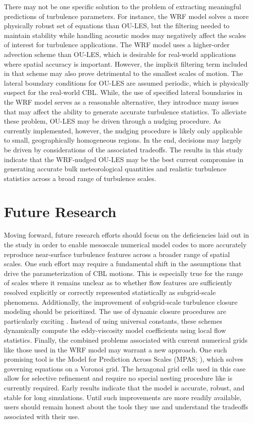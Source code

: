 There may not be one specific solution to the problem of extracting meaningful predictions of turbulence parameters. For instance, the WRF model solves a more physically robust set of equations than OU-LES, but the filtering needed to maintain stability while handling acoustic modes may negatively affect the scales of interest for turbulence applications. The WRF model uses a higher-order advection scheme than OU-LES, which is desirable for real-world applications where spatial accuracy is important. However, the implicit filtering term included in that scheme may also prove detrimental to the smallest scales of motion. The lateral boundary conditions for OU-LES are assumed periodic, which is physically suspect for the real-world CBL. While, the use of specified lateral boundaries in the WRF model serves as a reasonable alternative, they introduce many issues that may affect the ability to generate accurate turbulence statistics. To alleviate these problem, OU-LES may be driven through a nudging procedure. As currently implemented, however, the nudging procedure is likely only applicable to small, geographically homogeneous regions. In the end, decisions may largely be driven by considerations of the associated tradeoffs. The results in this study indicate that the WRF-nudged OU-LES may be the best current compromise in generating accurate bulk meteorological quantities and realistic turbulence statistics across a broad range of turbulence scales.

\section{Future Research}
\label{future-72}

Moving forward, future research efforts should focus on the deficiencies laid out in the study in order to enable mesoscale numerical model codes to more accurately reproduce near-surface turbulence features across a broader range of spatial scales. One such effort may require a fundamental shift in the assumptions that drive the parameterization of CBL motions. This is especially true for the range of scales where it remains unclear as to whether flow features are sufficiently resolved explicitly or correctly represented statistically as subgrid-scale phenomena. Additionally, the improvement of subgrid-scale turbulence closure modeling should be prioritized. The use of dynamic closure procedures are particularly exciting . Instead of using universal constants, these schemes dynamically compute the eddy-viscosity model coefficients using local flow statistics. Finally, the combined problems associated with current numerical grids like those used in the WRF model may warrant a new approach. One such promising tool is the Model for Prediction Across Scales (MPAS; \citealt{MPAS}), which solves governing equations on a Voronoi grid. The hexagonal grid cells used in this case allow for selective refinement and require no special nesting procedure like is currently required. Early results indicate that the model is accurate, robust, and stable for long simulations. Until such improvements are more readily available, users should remain honest about the tools they use and understand the tradeoffs associated with their use.




